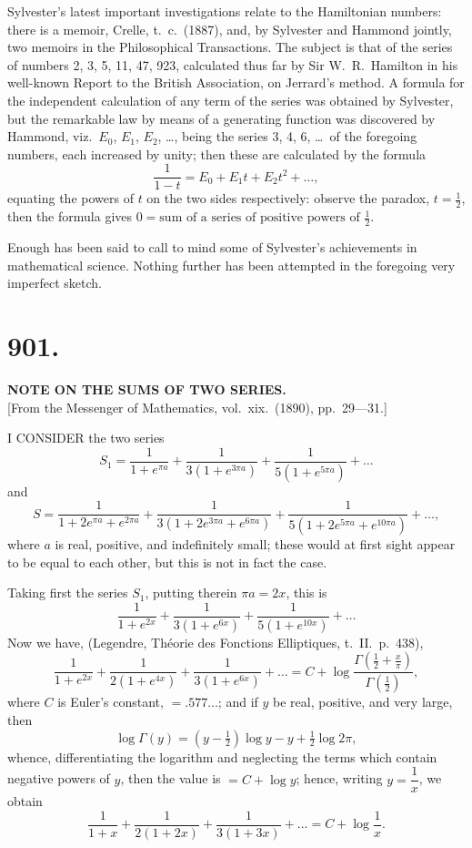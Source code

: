 \documentclass[11pt,a4paper]{book}
\begin{document}
Sylvester's latest important investigations relate to the Hamiltonian numbers: there is a memoir, Crelle, t.\ c.\ (1887), and, by Sylvester and Hammond jointly, two memoirs in the Philosophical Transactions. The subject is that of the series of numbers 2, 3, 5, 11, 47, 923, calculated thus far by Sir W.\ R.\ Hamilton in his well-known Report to the British Association, on Jerrard's method. A formula for the independent calculation of any term of the series was obtained by Sylvester, but the remarkable law by means of a generating function was discovered by Hammond, viz.\ $E_0$, $E_1$, $E_2$, \ldots, being the series 3, 4, 6, \ldots\ of the foregoing numbers, each increased by unity; then these are calculated by the formula
\[
\frac{1}{1-t} = E_0 + E_1t + E_2t^2 + \ldots,
\]
equating the powers of $t$ on the two sides respectively: observe the paradox, $t = \tfrac{1}{2}$, then the formula gives $0 = \text{sum of a series of positive powers of }\tfrac{1}{2}$.

Enough has been said to call to mind some of Sylvester's achievements in mathematical science. Nothing further has been attempted in the foregoing very imperfect sketch.


\section*{901.}
\begin{center}
{\large\bfseries NOTE ON THE SUMS OF TWO SERIES.}\\[0.5em]
\small [From the Messenger of Mathematics, vol.\ xix.\ (1890), pp.\ 29---31.]
\end{center}

I CONSIDER the two series
\[
S_1 = \frac{1}{1+e^{\pi a}} + \frac{1}{3(1+e^{3\pi a})} + \frac{1}{5(1+e^{5\pi a})} + \ldots
\]
and
\[
S = \frac{1}{1+2e^{\pi a}+e^{2\pi a}} + \frac{1}{3(1+2e^{3\pi a}+e^{6\pi a})} + \frac{1}{5(1+2e^{5\pi a}+e^{10\pi a})} + \ldots,
\]
where $a$ is real, positive, and indefinitely small; these would at first sight appear to be equal to each other, but this is not in fact the case.

Taking first the series $S_1$, putting therein $\pi a = 2x$, this is
\[
\frac{1}{1+e^{2x}} + \frac{1}{3(1+e^{6x})} + \frac{1}{5(1+e^{10x})} + \ldots
\]
Now we have, (Legendre, Th\'eorie des Fonctions Elliptiques, t.\ II.\ p.\ 438),
\[
\frac{1}{1+e^{2x}} + \frac{1}{2(1+e^{4x})} + \frac{1}{3(1+e^{6x})} + \ldots = C + \log\frac{\Gamma(\tfrac{1}{2} + \tfrac{x}{\pi})}{\Gamma(\tfrac{1}{2})},
\]
where $C$ is Euler's constant, $= .577\ldots$; and if $y$ be real, positive, and very large, then
\[
\log\Gamma(y) = (y - \tfrac{1}{2})\log y - y + \tfrac{1}{2}\log 2\pi,
\]
whence, differentiating the logarithm and neglecting the terms which contain negative powers of $y$, then the value is $= C + \log y$; hence, writing $y = \dfrac{1}{x}$, we obtain
\[
\frac{1}{1+x} + \frac{1}{2(1+2x)} + \frac{1}{3(1+3x)} + \ldots = C + \log\frac{1}{x}.
\]
\end{document}
